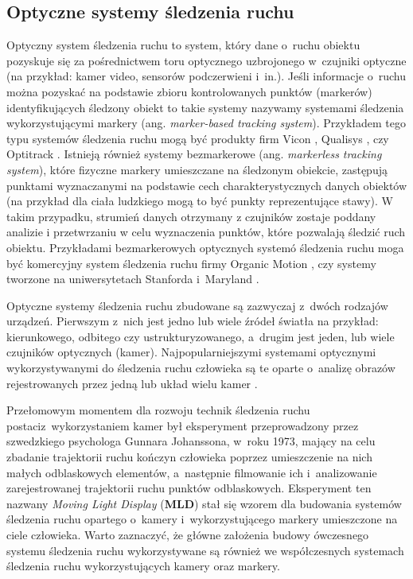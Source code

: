 \subsection{Optyczne systemy śledzenia ruchu}
Optyczny system śledzenia ruchu to system, który dane o~ruchu obiektu pozyskuje się za pośrednictwem toru optycznego uzbrojonego w~czujniki optyczne (na przykład: kamer video, sensorów podczerwieni i~in.). Jeśli informacje o~ruchu można pozyskać na podstawie zbioru kontrolowanych punktów (markerów) identyfikujących śledzony obiekt to takie systemy nazywamy systemami śledzenia wykorzystującymi markery (ang. \textsl{marker-based tracking system}). Przykładem tego typu systemów śledzenia ruchu mogą być produkty firm Vicon , Qualisys , czy Optitrack . Istnieją również systemy bezmarkerowe (ang. \textsl{markerless tracking system}), które fizyczne markery umieszczane na śledzonym obiekcie, zastępują punktami wyznaczanymi na podstawie cech charakterystycznych danych obiektów (na przykład dla ciała ludzkiego mogą to być punkty reprezentujące stawy). W takim przypadku, strumień danych otrzymany z czujników zostaje poddany analizie i przetwrzaniu w celu wyznaczenia punktów, które pozwalają śledzić ruch obiektu. Przykładami bezmarkerowych optycznych systemó śledzenia ruchu moga być komercyjny system śledzenia ruchu firmy Organic Motion , czy systemy tworzone na uniwersytetach Stanforda  i~Maryland \cite{Sundaresan2005,Sundaresan2007}.

Optyczne systemy śledzenia ruchu zbudowane są zazwyczaj z~dwóch rodzajów urządzeń. Pierwszym z~nich jest jedno lub wiele źródeł światła na przykład: kierunkowego, odbitego czy ustrukturyzowanego, a~drugim jest jeden, lub wiele czujników optycznych (kamer). Najpopularniejszymi systemami optycznymi wykorzystywanymi do śledzenia ruchu człowieka są te oparte o~analizę obrazów rejestrowanych przez jedną \cite{schmidt2006kernel,RuiLi2006} lub układ wielu kamer  \cite{Sundaresan2005,Krzeszowski2013}.

Przełomowym momentem dla rozwoju technik śledzenia ruchu postaciz~wykorzystaniem kamer był eksperyment przeprowadzony przez szwedzkiego psychologa Gunnara Johanssona, w~roku 1973, mający na celu zbadanie trajektorii ruchu kończyn człowieka poprzez umieszczenie na nich małych odblaskowych elementów, a~następnie filmowanie ich i~analizowanie zarejestrowanej trajektorii ruchu punktów odblaskowych. Eksperyment ten nazwany \emph{Moving Light Display} (\textbf{MLD}) \cite{Johansson1973} stał się wzorem dla budowania systemów śledzenia ruchu opartego o~kamery i~wykorzystującego markery umieszczone na ciele człowieka. Warto zaznaczyć, że główne założenia budowy ówczesnego systemu śledzenia ruchu wykorzystywane są również we współczesnych systemach śledzenia ruchu wykorzystujących kamery oraz markery.

